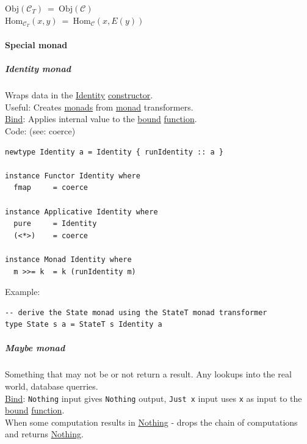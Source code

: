 \documentclass[a4paper,14pt,oneside]{book}
\begin{document}
\(\mathrm{Obj}(\mathcal{C}_{T}) \ = \ \mathrm{Obj}(\mathcal{C})\)\\
\(\mathrm{Hom}_{\mathcal{C}_{T}}(x,y) \ = \ \mathrm{Hom}_{\mathcal{C}}(x,E(y))\)\\

\paragraph{\label{org17d40f7}Special monad}
\label{sec:org89833d9}
\subparagraph{\label{org820f41a}Identity monad}
\label{sec:orge52d786}
Wraps data in the \hyperref[org0c2b817]{Identity} \hyperref[orge0f73cc]{constructor}.\\

Useful: Creates \hyperref[orgb4d8700]{monads} from \hyperref[org27993ff]{monad} transformers.\\

\hyperref[org624c8a5]{Bind}: Applies internal value to the \hyperref[org616bef9]{bound} \hyperref[org25ee224]{function}.\\

Code: (see: coerce)\\
\begin{verbatim}
newtype Identity a = Identity { runIdentity :: a }

instance Functor Identity where
  fmap     = coerce

instance Applicative Identity where
  pure     = Identity
  (<*>)    = coerce

instance Monad Identity where
  m >>= k  = k (runIdentity m)
\end{verbatim}

Example:\\
\begin{verbatim}
-- derive the State monad using the StateT monad transformer
type State s a = StateT s Identity a
\end{verbatim}

\subparagraph{\label{orge53c694}Maybe monad}
\label{sec:org3142293}
Something that may not be or not return a result. Any lookups into the real world, database querries.\\

\hyperref[org624c8a5]{Bind}: \texttt{Nothing} input gives \texttt{Nothing} output, \texttt{Just x} input uses \texttt{x} as input to the \hyperref[org616bef9]{bound} \hyperref[org25ee224]{function}.\\

When some computation results in \hyperref[org883e27e]{Nothing} -  drops the chain of computations and returns \hyperref[org883e27e]{Nothing}.\\
\end{document}
